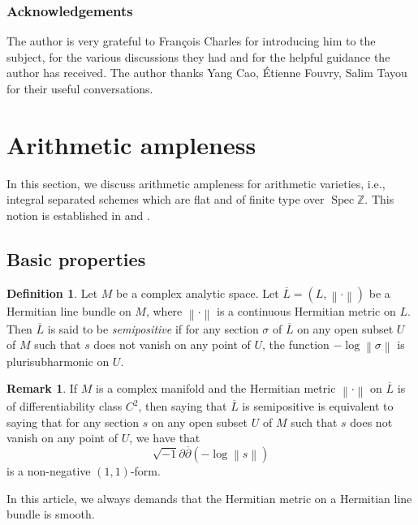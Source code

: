 \documentclass[11pt]{article}
\newcommand{\ie}{i.e.,\xspace}
\newcommand{\Subsection}{\subsection}
\numberwithin{equation}{section}
\theoremstyle{plain}
\theoremstyle{definition}
\newtheorem*{defi}{Definition}
\newtheorem*{rmq}{Remark}
\newcommand{\Z}{\mathbb{Z}}
\DeclareMathOperator{\Spec}{Spec}
\begin{document}
\subsubsection*{Acknowledgements}
The author is very grateful to François Charles for introducing him to the subject, for the various discussions they had and for the helpful guidance the author has received. The author thanks Yang Cao, Étienne Fouvry, Salim Tayou for their useful conversations.

\section{Arithmetic ampleness}\label{arithample}

In this section, we discuss arithmetic ampleness for arithmetic varieties, \ie integral separated schemes which are flat and of finite type over $\Spec \Z$. This notion is established in \cite{Zh92} and \cite{Zh95}.

\Subsection{Basic properties}
\begin{defi}
Let $M$ be a complex analytic space. Let $\overline{L}=(L,\left\lVert \cdot \right\rVert)$ be a Hermitian line bundle on $M$, where $\left\lVert \cdot \right\rVert$ is a continuous Hermitian metric on $L$. Then $\overline{L}$ is said to be \emph{semipositive} if for any section $\sigma$ of $\overline{L}$ on any open subset $U$ of $M$ such that $s$ does not vanish on any point of $U$, the function $-\log \left\lVert \sigma \right\rVert$ is plurisubharmonic on $U$.
\end{defi}
\begin{rmq}
If $M$ is a complex manifold and the Hermitian metric $\left\lVert \cdot \right\rVert$ on $\overline{L}$ is of differentiability class $C^2$, then saying that $\overline{L}$ is semipositive is equivalent to saying that for any section $s$ on any open subset $U$ of $M$ such that $s$ does not vanish on any point of $U$, we have that
\[
\sqrt{-1}\partial \overline{\partial}\left(-\log \left\lVert s \right\rVert\right)
\]
is a non-negative $(1,1)$-form.
\end{rmq}
In this article, we always demands that the Hermitian metric on a Hermitian line bundle is smooth.
\end{document}
